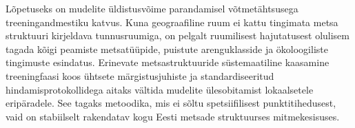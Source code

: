 Lõpetuseks on mudelite üldistusvõime parandamisel võtmetähtsusega treeningandmestiku katvus. Kuna geograafiline ruum ei kattu tingimata metsa struktuuri kirjeldava tunnusruumiga, on pelgalt ruumilisest hajutatusest olulisem tagada kõigi peamiste metsatüüpide, puistute arenguklasside ja ökoloogiliste tingimuste esindatus. Erinevate metsastruktuuride süstemaatiline kaasamine treeningfaasi koos ühtsete märgistusjuhiste ja standardiseeritud hindamisprotokollidega aitaks vältida mudelite ülesobitamist lokaalsetele eripäradele. See tagaks metoodika, mis ei sõltu spetsiifilisest punktitihedusest, vaid on stabiilselt rakendatav kogu Eesti metsade struktuurses mitmekesisuses.
